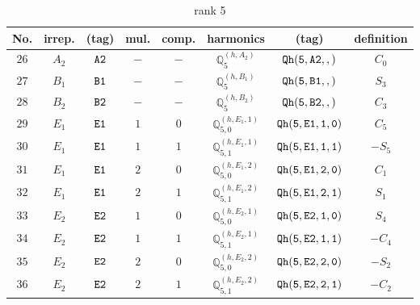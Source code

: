 \documentclass[fleqn,8pt]{jsarticle}
\begin{document}
\begin{table}[ht!]
\begin{center}
\caption{rank 5}
\renewcommand{\arraystretch}{1.3}
\begin{tabular}{cccccccc} \hline \hline
No. & irrep. & (tag) & mul. & comp. & harmonics & (tag) & definition \\ \hline
$ 26 $ & $ A_{2} $ & $ {\tt A2} $ & $ - $ & $ - $ & $ \mathbb{Q}_{5}^{(h,A_{2})} $ & $ {\tt Qh(5,A2,,)} $ & $ C_{0} $ \\
$ 27 $ & $ B_{1} $ & $ {\tt B1} $ & $ - $ & $ - $ & $ \mathbb{Q}_{5}^{(h,B_{1})} $ & $ {\tt Qh(5,B1,,)} $ & $ S_{3} $ \\
$ 28 $ & $ B_{2} $ & $ {\tt B2} $ & $ - $ & $ - $ & $ \mathbb{Q}_{5}^{(h,B_{2})} $ & $ {\tt Qh(5,B2,,)} $ & $ C_{3} $ \\
$ 29 $ & $ E_{1} $ & $ {\tt E1} $ & $ 1 $ & $ 0 $ & $ \mathbb{Q}_{5,0}^{(h,E_{1},1)} $ & $ {\tt Qh(5,E1,1,0)} $ & $ C_{5} $ \\
$ 30 $ & $ E_{1} $ & $ {\tt E1} $ & $ 1 $ & $ 1 $ & $ \mathbb{Q}_{5,1}^{(h,E_{1},1)} $ & $ {\tt Qh(5,E1,1,1)} $ & $ - S_{5} $ \\
$ 31 $ & $ E_{1} $ & $ {\tt E1} $ & $ 2 $ & $ 0 $ & $ \mathbb{Q}_{5,0}^{(h,E_{1},2)} $ & $ {\tt Qh(5,E1,2,0)} $ & $ C_{1} $ \\
$ 32 $ & $ E_{1} $ & $ {\tt E1} $ & $ 2 $ & $ 1 $ & $ \mathbb{Q}_{5,1}^{(h,E_{1},2)} $ & $ {\tt Qh(5,E1,2,1)} $ & $ S_{1} $ \\
$ 33 $ & $ E_{2} $ & $ {\tt E2} $ & $ 1 $ & $ 0 $ & $ \mathbb{Q}_{5,0}^{(h,E_{2},1)} $ & $ {\tt Qh(5,E2,1,0)} $ & $ S_{4} $ \\
$ 34 $ & $ E_{2} $ & $ {\tt E2} $ & $ 1 $ & $ 1 $ & $ \mathbb{Q}_{5,1}^{(h,E_{2},1)} $ & $ {\tt Qh(5,E2,1,1)} $ & $ - C_{4} $ \\
$ 35 $ & $ E_{2} $ & $ {\tt E2} $ & $ 2 $ & $ 0 $ & $ \mathbb{Q}_{5,0}^{(h,E_{2},2)} $ & $ {\tt Qh(5,E2,2,0)} $ & $ - S_{2} $ \\
$ 36 $ & $ E_{2} $ & $ {\tt E2} $ & $ 2 $ & $ 1 $ & $ \mathbb{Q}_{5,1}^{(h,E_{2},2)} $ & $ {\tt Qh(5,E2,2,1)} $ & $ - C_{2} $ \\
 \hline \hline
\end{tabular}
\end{center}
\end{table}
\end{document}
